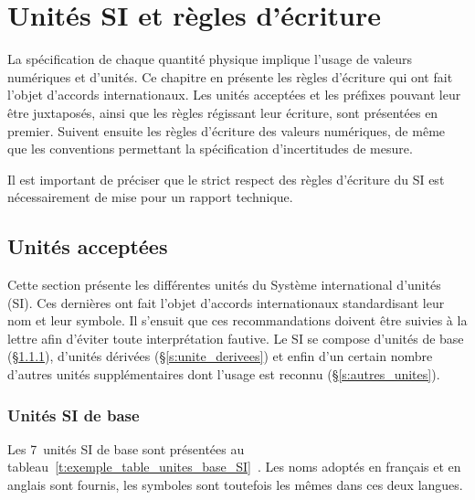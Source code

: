 
%
%

\chapter{Unités SI et règles d'écriture}
\label{s:SI}

La spécification de chaque quantité physique implique l'usage de valeurs numériques et d'unités. Ce chapitre en présente les règles d'écriture qui ont fait l'objet d'accords internationaux. Les unités acceptées et les préfixes pouvant leur être juxtaposés, ainsi que les règles régissant leur écriture, sont présentées en premier. Suivent ensuite les règles d'écriture des valeurs numériques, de même que les conventions permettant la spécification d'incertitudes de mesure.

Il est important de préciser que le strict respect des règles d'écriture du SI est nécessairement de mise pour un rapport technique.


\section{Unités acceptées}
\label{s:unite_acceptees}

Cette section présente les différentes unités du Système international d'unités (SI). Ces dernières ont fait l'objet d'accords internationaux standardisant leur nom et leur symbole. Il s'ensuit que ces recommandations doivent être suivies à la lettre afin d'éviter toute interprétation fautive. Le SI se compose d'unités de base (\S\ref{s:unite_base}), d'unités dérivées (\S\ref{s:unite_derivees}) et enfin d'un certain nombre d'autres unités supplémentaires dont l'usage est reconnu (\S\ref{s:autres_unites}).


\subsection{Unités SI de base}
\label{s:unite_base}

Les 7~unités SI de base sont présentées au tableau~\ref{t:exemple_table_unites_base_SI}~\cite{BIP98}. Les noms adoptés en français et en anglais sont fournis, les symboles sont toutefois les mêmes dans ces deux langues.

